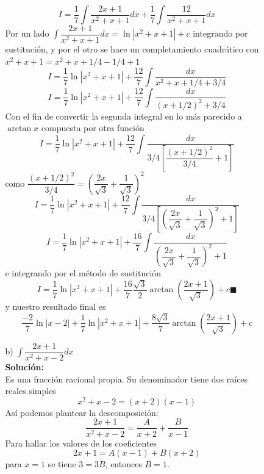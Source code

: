 \documentclass[10pt,twoside]{SelfArx} %
\begin{document}
\begin{enumerate}
\begin{enumerate}
\begin{enumerate}
\begin{equation}
I=\dfrac{1}{7}\int\dfrac{2x+1}{x^{2}+x+1}dx+\dfrac{1}{7}\int\dfrac{12}{x^{2}+x+1}dx
\end{equation}
Por un lado $ \int\dfrac{2x+1}{x^{2}+x+1}dx=\ln|x^{2}+x+1|+c $ integrando por sustituci\'on, y por el otro se hace un completamiento cuadr\'atico con $ x^{2}+x+1=x^{2}+x+1/4-1/4+1 $
\begin{equation}
I=\dfrac{1}{7}\ln|x^{2}+x+1|+\dfrac{12}{7}\int\dfrac{dx}{x^{2}+x+1/4+3/4}
\end{equation}
\begin{equation}
I=\dfrac{1}{7}\ln|x^{2}+x+1|+\dfrac{12}{7}\int\dfrac{dx}{(x+1/2)^{2}+3/4}
\end{equation}
Con el fin de convertir la segunda integral en lo más parecido a $ \arctan x $ compuesta por otra funci\'on
\begin{equation}
I=\dfrac{1}{7}\ln|x^{2}+x+1|+\dfrac{12}{7}\int\dfrac{dx}{3/4\left [\dfrac{(x+1/2)^{2}}{3/4}+1\right ]}
\end{equation}
como $ \dfrac{(x+1/2)^{2}}{3/4}=\left (\dfrac{2x}{\sqrt{3}}+\dfrac{1}{\sqrt{3}}\right )^{2} $
\begin{equation}
I=\dfrac{1}{7}\ln|x^{2}+x+1|+\dfrac{12}{7}\int\dfrac{dx}{3/4\left [\left (\dfrac{2x}{\sqrt{3}}+\dfrac{1}{\sqrt{3}}\right )^{2}+1\right ]}
\end{equation}
\begin{equation}
I=\dfrac{1}{7}\ln|x^{2}+x+1|+\dfrac{16}{7}\int\dfrac{dx}{\left (\dfrac{2x}{\sqrt{3}}+\dfrac{1}{\sqrt{3}}\right )^{2}+1}
\end{equation}
e integrando por el método de sustitución
\begin{equation}
I=\dfrac{1}{7}\ln|x^{2}+x+1|+\dfrac{16}{7}\frac{\sqrt{3}}{2}\arctan \left (\dfrac{2x+1}{\sqrt{3}}\right )+c\blacksquare
\end{equation}
y nuestro resultado final es 
\begin{equation}
\dfrac{-2}{7}\ln|x-2|+\dfrac{1}{7}\ln|x^{2}+x+1|+\dfrac{8\sqrt{3}}{7}\arctan\left  (\dfrac{2x+1}{\sqrt{3}}\right )+c
\end{equation}
\item [b)]$ \int \dfrac{2x+1}{x^{2}+x-2}dx $\\
\textbf{Solución:}\\
Es una fracción  racional propia. Su denominador tiene dos raíces reales simples
\[ x^{2}+x-2=(x+2)(x-1) \]
Así podemos plantear la descomposición:
\[ \dfrac{2x+1}{x^{2}+x-2}=\dfrac{A}{x+2}+\dfrac{B}{x-1} \]
Para hallar los valores de los coeficientes
\[ 2x+1=A(x-1)+B(x+2) \]
para $ x=1 $ se tiene $ 3=3B $, entonces $ B=1 $.\\

\end{enumerate}
\end{enumerate}
\end{enumerate}
\end{document}
